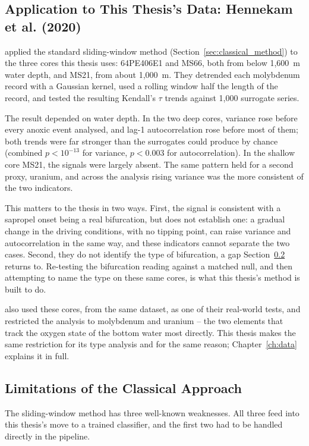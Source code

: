 \subsection{Application to This Thesis's Data: Hennekam et al. (2020)}
\label{sec:hennekam_ews}
\citet{hennekam2020} applied the standard sliding-window method (Section~\ref{sec:classical_method}) to the three cores this thesis uses: 64PE406E1 and MS66, both from below 1{,}600~m water depth, and MS21, from about 1{,}000~m. They detrended each molybdenum record with a Gaussian kernel, used a rolling window half the length of the record, and tested the resulting Kendall's $\tau$ trends against 1{,}000 surrogate series.

The result depended on water depth. In the two deep cores, variance rose before every anoxic event analysed, and lag-1 autocorrelation rose before most of them; both trends were far stronger than the surrogates could produce by chance (combined $p < 10^{-13}$ for variance, $p < 0.003$ for autocorrelation). In the shallow core MS21, the signals were largely absent. The same pattern held for a second proxy, uranium, and across the analysis rising variance was the more consistent of the two indicators.

This matters to the thesis in two ways. First, the signal is consistent with a sapropel onset being a real bifurcation, but does not establish one: a gradual change in the driving conditions, with no tipping point, can raise variance and autocorrelation in the same way, and these indicators cannot separate the two cases. Second, they do not identify the type of bifurcation, a gap Section~\ref{sec:classical_limitations} returns to. Re-testing the bifurcation reading against a matched null, and then attempting to name the type on these same cores, is what this thesis's method is built to do.

\citet{bury2021} also used these cores, from the same \citet{hennekam2020} dataset, as one of their real-world tests, and restricted the analysis to molybdenum and uranium -- the two elements that track the oxygen state of the bottom water most directly. This thesis makes the same restriction for its type analysis and for the same reason; Chapter~\ref{ch:data} explains it in full.

\subsection{Limitations of the Classical Approach}
\label{sec:classical_limitations}
The sliding-window method has three well-known weaknesses. All three feed into this thesis's move to a trained classifier, and the first two had to be handled directly in the pipeline.

